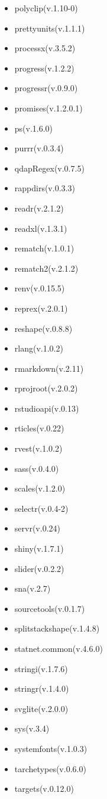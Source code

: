 \documentclass[
]{article}
\begin{document}
\begin{itemize}
\item
  polyclip(v.1.10-0)
\item
  prettyunits(v.1.1.1)
\item
  processx(v.3.5.2)
\item
  progress(v.1.2.2)
\item
  progressr(v.0.9.0)
\item
  promises(v.1.2.0.1)
\item
  ps(v.1.6.0)
\item
  purrr(v.0.3.4)
\item
  qdapRegex(v.0.7.5)
\item
  rappdirs(v.0.3.3)
\item
  readr(v.2.1.2)
\item
  readxl(v.1.3.1)
\item
  rematch(v.1.0.1)
\item
  rematch2(v.2.1.2)
\item
  renv(v.0.15.5)
\item
  reprex(v.2.0.1)
\item
  reshape(v.0.8.8)
\item
  rlang(v.1.0.2)
\item
  rmarkdown(v.2.11)
\item
  rprojroot(v.2.0.2)
\item
  rstudioapi(v.0.13)
\item
  rticles(v.0.22)
\item
  rvest(v.1.0.2)
\item
  sass(v.0.4.0)
\item
  scales(v.1.2.0)
\item
  selectr(v.0.4-2)
\item
  servr(v.0.24)
\item
  shiny(v.1.7.1)
\item
  slider(v.0.2.2)
\item
  sna(v.2.7)
\item
  sourcetools(v.0.1.7)
\item
  splitstackshape(v.1.4.8)
\item
  statnet.common(v.4.6.0)
\item
  stringi(v.1.7.6)
\item
  stringr(v.1.4.0)
\item
  svglite(v.2.0.0)
\item
  sys(v.3.4)
\item
  systemfonts(v.1.0.3)
\item
  tarchetypes(v.0.6.0)
\item
  targets(v.0.12.0)

\end{itemize}
\end{document}
